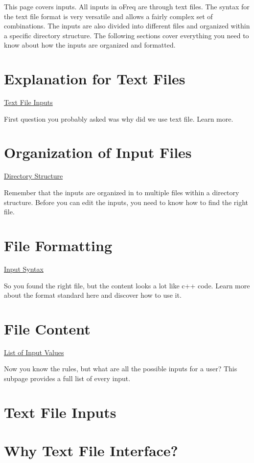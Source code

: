 This page covers inputs. All inputs in o\-Freq are through text files. The syntax for the text file format is very versatile and allows a fairly complex set of combinations. The inputs are also divided into different files and organized within a specific directory structure. The following sections cover everything you need to know about how the inputs are organized and formatted.

\section*{Explanation for Text Files}

\hyperlink{why_text_files}{Text File Inputs}

First question you probably asked was why did we use text file. Learn more.

\section*{Organization of Input Files}

\hyperlink{directory_structure}{Directory Structure}

Remember that the inputs are organized in to multiple files within a directory structure. Before you can edit the inputs, you need to know how to find the right file.

\section*{File Formatting}

\hyperlink{input_syntax}{Input Syntax}

So you found the right file, but the content looks a lot like c++ code. Learn more about the format standard here and discover how to use it.

\section*{File Content}

\hyperlink{input_values}{List of Input Values}

Now you know the rules, but what are all the possible inputs for a user? This subpage provides a full list of every input. \hypertarget{why_text_files}{}\section{Text File Inputs}\label{why_text_files}
\section*{Why Text File Interface?}

